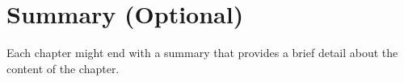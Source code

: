 \section{Summary (Optional)}
\begin{justify}
Each chapter might end with a summary that provides a brief detail about the content of the chapter.
\end{justify}

\clearpage
